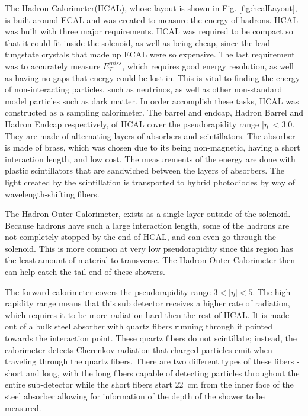 The Hadron Calorimeter(HCAL), whose layout is shown in Fig. \ref{fig:hcalLayout}, is built around ECAL and was created to measure the energy of hadrons. HCAL was built with three major requirements.  HCAL was required to be compact so that it could fit inside the solenoid, as well as being cheap, since the lead tungstate crystals that made up ECAL were so expensive. The last requirement was to accurately measure $E^{miss}_T$, which requires good energy resolution, as well as having no gaps that energy could be lost in. This is vital to finding the energy of non-interacting particles, such as neutrinos, as well as other non-standard model particles such as dark matter. In order accomplish these tasks, HCAL was constructed as a sampling calorimeter. The barrel and endcap, Hadron Barrel and Hadron Endcap respectively, of HCAL cover the pseudorapidity range $|\eta|<3.0$. They are made of alternating layers of absorbers and scintillators. The absorber is made of brass, which was chosen due to its being non-magnetic, having a short interaction length, and low cost. The measurements of the energy are done with plastic scintillators that are sandwiched between the layers of absorbers. The light created by the scintillation is transported to hybrid photodiodes by way of wavelength-shifting fibers. 

The Hadron Outer Calorimeter, exists as a single layer outside of the solenoid. Because hadrons have such a large interaction length, some of the hadrons are not completely stopped by the end of HCAL, and can even go through the solenoid. This is more common at very low pseudorapidity since this region  has the least amount of material to transverse.  The Hadron Outer Calorimeter then can help catch the tail end of these showers.

The forward calorimeter covers the pseudorapidity range $3<|\eta|<5$.  The high rapidity range means that this sub detector receives a higher rate of radiation, which requires it to be more radiation hard then the rest of HCAL. It is made out of a bulk steel absorber with quartz fibers running through it pointed towards the interaction point. These quartz fibers do not scintillate; instead, the calorimeter detects Cherenkov radiation that charged particles emit when traveling through the quartz fibers. There are two different types of these fibers - short and long, with the long fibers capable of detecting particles throughout the entire sub-detector while the short fibers start \SI{22}{\centi\meter} from the inner face of the steel absorber allowing for information of the depth of the shower to be measured. 


